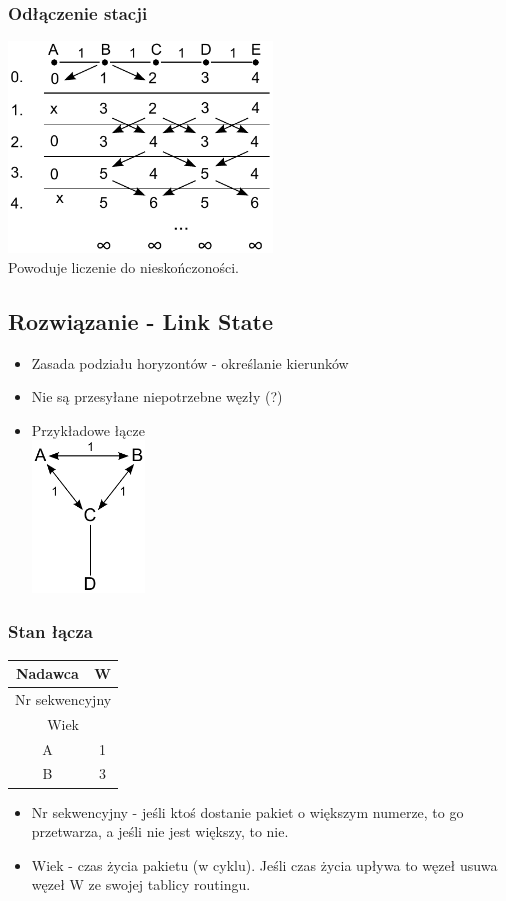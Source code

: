 \documentclass[a4paper,twoside]{article}
\begin{document}
			\subsubsection{Odłączenie stacji}
				\includegraphics[width=7.0cm]{./images/image43.pdf}\\
				Powoduje liczenie do nieskończoności.
		\subsection{Rozwiązanie - Link State}
			\begin{itemize}
				\item Zasada podziału horyzontów - określanie kierunków
				\item Nie są przesyłane niepotrzebne węzły (?)
				\item Przykładowe łącze\\
				\includegraphics[width=3.0cm]{./images/image44.pdf}
			\end{itemize}
			\subsubsection{Stan łącza}
				\begin{tabular}{|c|l|c|c|}
					\hline
					\multicolumn{3}{|c|}{Nadawca}           & W      \\ \hline
					\multicolumn{4}{|c|}{Nr sekwencyjny}             \\ \hline
					\multicolumn{4}{|c|}{Wiek}                       \\ \hline
					\multicolumn{3}{|c|}{A} & \multicolumn{1}{c|}{1} \\ \hline
					\multicolumn{3}{|c|}{B} & \multicolumn{1}{c|}{3} \\ \hline
				\end{tabular}
				\begin{itemize}
					\item Nr sekwencyjny - jeśli ktoś dostanie pakiet o większym numerze, to go przetwarza, a jeśli nie jest większy, to nie.
					\item Wiek - czas życia pakietu (w cyklu). Jeśli czas życia upływa to węzeł usuwa węzeł W ze swojej tablicy routingu.
				\end{itemize}
\end{document}
